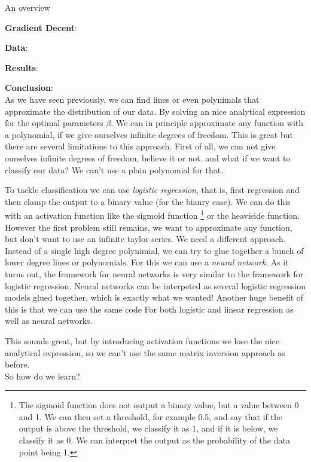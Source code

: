 \documentclass[twoside,11pt]{report}
\begin{document}
An overview

\textbf{Gradient Decent}: 

\textbf{Data}: 

\textbf{Results}:

\textbf{Conclusion}:\\

As we have seen previously, we can find lines or even polynimals that approximate the distribution of our data.
By solving an nice analytical expression for the optimal parameters $\beta$. We can in principle approximate 
any function with a polynomial, if we give ourselves infinite degrees of freedom. This is great but there are several
limitations to this approach. First of all, we can not give ourselves infinite degrees of freedom, believe it or not.
and what if we want to classify our data? We can't use a plain polynomial for that. 

To tackle classification we can use \emph{logistic regression}, that is, first regression and then clamp the output to a binary value
(for the bianry case). We can do this with an activation function like the sigmoid function
\footnote{The sigmoid function does not output a binary value, but a value between 0 and 1. 
    We can then set a threshold, for example 0.5, and say that if the output is above the threshold, 
    we classify it as 1, and if it is below, we classify it as 0. We can interpret the output as the probability of the data point being 1.}
or the heaviside function. However the first problem
still remains, we want to approximate any function, but don't want to use an infinite taylor series. 
We need a different approach.
Instead of a single high degree polynimial, we can try to glue together a bunch of lower degree lines or polynomials. 
For this we can use a \emph{neural network}.
As it turns out, the framework for neural networks is very similar to the framework for logistic regression.
Neural networks can be interpeted as several logistic regression models glued together, which is exactly what we wanted!
Another huge benefit of this is that we can use the same code
For both logistic and linear regression as well as neural networks.

This sounds great, but by introducing activation functions we lose the nice analytical expression,
so we can't use the same matrix inversion approach as before.\\
So how do we learn?
\end{document}
